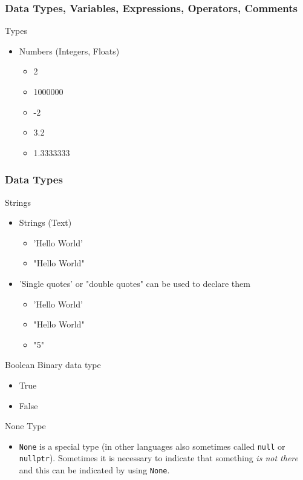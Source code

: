 \documentclass[10pt, a4paper]{beamer} %
\begin{document}
\begin{frame}[c]\frametitle{Data Types, Variables, Expressions, Operators, Comments}
	\begin{block}{Types}
		\begin{itemize}
			\item Numbers (Integers, Floats)
			      \begin{itemize}
				      \item 2
				      \item 1000000
				      \item -2
				      \item 3.2
				      \item 1.3333333
			      \end{itemize}
		\end{itemize}
	\end{block}

\end{frame}

\begin{frame}[c, allowframebreaks]\frametitle{Data Types}
	\begin{block}{Strings}
		\begin{itemize}
			\item Strings (Text)
			      \begin{itemize}
				      \item {\color{blue}'Hello World'}
				      \item {\color{red}"Hello World"}
			      \end{itemize}
			\item {\color{blue} 'Single quotes'} or {\color{red} "double quotes"} can be used to declare them
			      \begin{itemize}
				      \item 'Hello World'
				      \item "Hello World"
				      \item "5"
			      \end{itemize}
		\end{itemize}
	\end{block}
	\begin{block}{Boolean}
		Binary data type
		\begin{itemize}
			\item True
			\item False
		\end{itemize}
	\end{block}
	\begin{block}{None Type}
		\begin{itemize}
			\item \texttt{None} is a special type (in other languages also sometimes called \texttt{null} or \texttt{nullptr}).
			      Sometimes it is necessary to indicate that something \textit{is not there} and this can be indicated by using \texttt{None}.
		\end{itemize}
	\end{block}


\end{frame}
\end{document}
